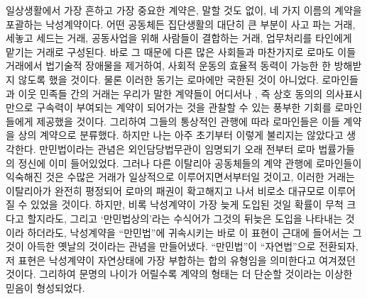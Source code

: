 일상생활에서
가장 흔하고 가장 중요한 계약은, 말할 것도 없이,
네 가지 이름의 계약을 포괄하는 낙성계약이다.
어떤 공동체든 집단생활의 대단히 큰 부분이
사고 파는 거래, 세놓고 세드는 거래,
공동사업을 위해 사람들이 결합하는 거래,
업무처리를 타인에게 맡기는 거래로 구성된다.
바로 그 때문에
다른 많은 사회들과 마찬가지로 로마도
이들 거래에서 법기술적 장애물을 제거하여,
사회적 운동의 효율적 동력이
가능한 한
방해받지 않도록 했을 것이다.
물론 이러한 동기는 로마에만 국한된 것이 아니었다.
로마인들과 이웃 민족들 간의 거래는
우리가 말한 계약들이 어디서나 ,
즉 상호 동의의 의사표시만으로 구속력이 부여되는 계약이
되어가는 것을 관찰할 수 있는
풍부한 기회를
로마인들에게
제공했을 것이다.
그리하여 그들의 통상적인 관행에 따라
로마인들은 이들 계약을
상의 계약으로 분류했다.
하지만 나는
아주 초기부터 이렇게 불리지는 않았다고 생각한다.
만민법이라는 관념은
외인담당법무관이 임명되기 오래 전부터
로마 법률가들의 정신에 이미 들어있었다.
그러나 다른 이탈리아 공동체들의 계약 관행에 로마인들이 익숙해진 것은
수많은 거래가 일상적으로 이루어지면서부터일 것이고,
이러한 거래는 이탈리아가 완전히 평정되어
로마의 패권이 확고해지고 나서
비로소 대규모로 이루어질 수 있었을 것이다.
하지만, 비록
낙성계약이 가장 늦게 도입된 것일 확률이 무척 크다고 할지라도,
그리고
`만민법상의'라는 수식어가 그것의 뒤늦은 도입을
나타내는 것이라 하더라도,
낙성계약을 ``만민법''에 귀속시키는
바로 이 표현이 근대에 들어서는
그것이 아득한 옛날의 것이라는 관념을 만들어냈다.
``만민법''이
``자연법''으로
전환되자,
저 표현은
낙성계약이 자연상태에 가장 부합하는 합의 유형임을
의미한다고 여겨졌던 것이다.
그리하여 문명의 나이가 어릴수록
계약의 형태는 더 단순할 것이라는 이상한 믿음이 형성되었다.

